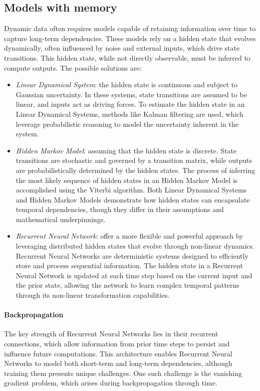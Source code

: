 \subsection{Models with memory}
Dynamic data often requires models capable of retaining information over time to capture long-term dependencies. 
These models rely on a hidden state that evolves dynamically, often influenced by noise and external inputs, which drive state transitions.
This hidden state, while not directly observable, must be inferred to compute outputs.
The possible solutions are: 
\begin{itemize}
    \item \textit{Linear Dynamical System}: the hidden state is continuous and subject to Gaussian uncertainty. 
        In these systems, state transitions are assumed to be linear, and inputs act as driving forces. 
        To estimate the hidden state in an Linear Dynamical Systems, methods like Kalman filtering are used, which leverage probabilistic reasoning to model the uncertainty inherent in the system.
    \item \textit{Hidden Markov Model}: assuming that the hidden state is discrete. 
        State transitions are stochastic and governed by a transition matrix, while outputs are probabilistically determined by the hidden states. 
        The process of inferring the most likely sequence of hidden states in an Hidden Markov Model is accomplished using the Viterbi algorithm. 
        Both Linear Dynamical Systems and Hidden Markov Models demonstrate how hidden states can encapsulate temporal dependencies, though they differ in their assumptions and mathematical underpinnings.
    \item \textit{Recurrent Neural Network}: offer a more flexible and powerful approach by leveraging distributed hidden states that evolve through non-linear dynamics. 
        Recurrent Neural Networks are deterministic systems designed to efficiently store and process sequential information. 
        The hidden state in a Recurrent Neural Network is updated at each time step based on the current input and the prior state, allowing the network to learn complex temporal patterns through its non-linear transformation capabilities.
\end{itemize}

\paragraph*{Backpropagation}
The key strength of Recurrent Neural Networks lies in their recurrent connections, which allow information from prior time steps to persist and influence future computations. 
This architecture enables Recurrent Neural Networks to model both short-term and long-term dependencies, although training them presents unique challenges. 
One such challenge is the vanishing gradient problem, which arises during backpropagation through time.

